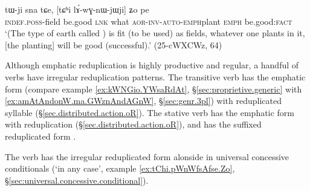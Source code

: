  \begin{exe}
\ex \label{ex:tChi.lAwGnWjWji.Zo}
\gll tɯ-ji sna tɕe, [tɕʰi lɤ́-wɣ-nɯ-jɯ\redp{}ji] ʑo pe \\
\textsc{indef}.\textsc{poss}-field be.good \textsc{lnk} what \textsc{aor}-\textsc{inv}-\textsc{auto}-\textsc{emph}\redp{}plant \textsc{emph} be.good:\textsc{fact} \\
\glt `(The type of earth called ) is fit (to be used) as fields, whatever one plants in it, [the planting] will be good (successful).' (25-cWXCWz, 64)
\end{exe}


Although emphatic reduplication is highly productive and regular, a handful of verbs have irregular reduplication patterns. The transitive verb   has the emphatic form  (compare example \ref{ex:kWNGio.YWsaRdAt}, §\ref{sec:proprietive.generic} with \ref{ex:amAtAndonW.ma.GWznAndAGnW}, §\ref{sec:genr.3pl}) with  reduplicated syllable (§\ref{sec.distributed.action.oR}).  The stative verb  has the emphatic form  with  reduplication (§\ref{sec.distributed.action.oR}), and  has the suffixed  reduplicated form .

The verb  has the irregular reduplicated form  alonside  in universal concessive conditionals (`in any case', example \ref{ex:tChi.pWnWfsAfse.Zo}, §\ref{sec:universal.concessive.conditional}).
